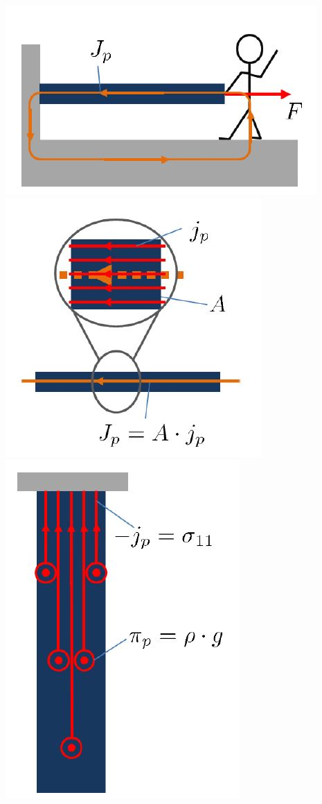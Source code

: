 		\includegraphics[scale=.3]{images/momentcons}
		\includegraphics[scale=.3]{images/momflux}
		\includegraphics[scale=.3]{images/momfluxdensity}
